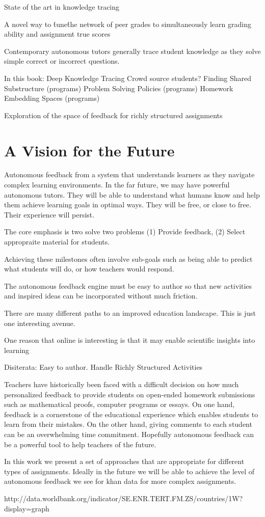 State of the art in knowledge tracing

A novel way to \'tune\' the network of peer grades to simultaneously learn grading ability and assignment true scores

Contemporary autonomous tutors generally trace student knowledge as they solve simple correct or incorrect questions.


In this book:
Deep Knowledge Tracing
Crowd source students?
Finding Shared Substructure (programs)
Problem Solving Policies (programs)
Homework Embedding Spaces (programs)



Exploration of the space of feedback for richly structured assignments

\section{A Vision for the Future}
Autonomous feedback from a system that understands learners as they navigate complex learning environments.
In the far future, we may have powerful autonomous tutors. They will be able to understand what humans know and help them achieve learning goals in optimal ways. They will be free, or close to free. Their experience will persist. 

The core emphasis is two solve two problems (1) Provide feedback, (2) Select appropraite material for students. 

Achieving these milestones often involve sub-goals such as being able to predict what students will do, or how teachers would respond.

The autonomous feedback engine must be easy to author so that new activities and inspired ideas can be incorporated without much friction.

There are many different paths to an improved education landscape. This is just one interesting avenue.

One reason that online is interesting is that it may enable scientific insights into learning

Disiterata:
Easy to author.
Handle Richly Structured Activities

Teachers have historically been faced with a difficult decision on how much personalized
feedback to provide students on open-ended homework submissions
such as mathematical proofs, computer programs or essays. On one hand, feedback
is a cornerstone of the educational experience which enables students to
learn from their mistakes. On the other hand, giving comments to each student
can be an overwhelming time commitment. Hopefully autonomous feedback can be a powerful tool to help teachers of the future.

In this work we present a set of approaches that are appropriate for different types of assignments. Ideally in the future we will be able to achieve the level of autonomous feedback we see for khan data for more complex assignments. 

http://data.worldbank.org/indicator/SE.ENR.TERT.FM.ZS/countries/1W?display=graph